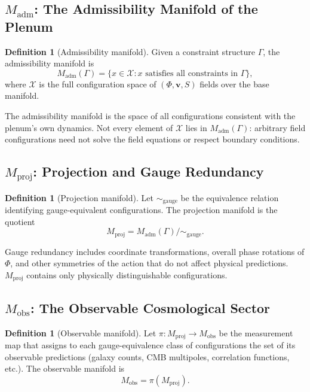 \documentclass[12pt,a4paper,twoside,openright]{book}
\theoremstyle{plain}
\theoremstyle{definition}
\newtheorem{definition}[theorem]{Definition}
\theoremstyle{remark}
\newcommand{\vfield}{\bm{v}}
\newcommand{\Sfield}{S}
\newcommand{\Phifield}{\Phi}
\newcommand{\Mad}{M_{\mathrm{adm}}}
\newcommand{\Mproj}{M_{\mathrm{proj}}}
\newcommand{\Mobs}{M_{\mathrm{obs}}}
\begin{document}
\subsection{\texorpdfstring{$\Mad$}{M\_adm}: The Admissibility Manifold of the Plenum}

\begin{definition}[Admissibility manifold]
Given a constraint structure $\Gamma$, the admissibility manifold is
\[
\Mad(\Gamma) = \{x \in \mathcal{X} : x \text{ satisfies all constraints in } \Gamma\},
\]
where $\mathcal{X}$ is the full configuration space of $(\Phifield, \vfield, \Sfield)$ fields over the base manifold.
\end{definition}

The admissibility manifold is the space of all configurations consistent with the plenum's own dynamics. Not every element of $\mathcal{X}$ lies in $\Mad(\Gamma)$: arbitrary field configurations need not solve the field equations or respect boundary conditions.

\subsection{\texorpdfstring{$\Mproj$}{M\_proj}: Projection and Gauge Redundancy}

\begin{definition}[Projection manifold]
Let $\sim_{\mathrm{gauge}}$ be the equivalence relation identifying gauge-equivalent configurations. The projection manifold is the quotient
\[
\Mproj = \Mad(\Gamma) / \sim_{\mathrm{gauge}}.
\]
\end{definition}

Gauge redundancy includes coordinate transformations, overall phase rotations of $\Phifield$, and other symmetries of the action that do not affect physical predictions. $\Mproj$ contains only physically distinguishable configurations.

\subsection{\texorpdfstring{$\Mobs$}{M\_obs}: The Observable Cosmological Sector}

\begin{definition}[Observable manifold]
Let $\pi: \Mproj \to \Mobs$ be the measurement map that assigns to each gauge-equivalence class of configurations the set of its observable predictions (galaxy counts, CMB multipoles, correlation functions, etc.). The observable manifold is
\[
\Mobs = \pi(\Mproj).
\]
\end{definition}
\end{document}
